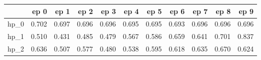 \begin{tabular}{lrrrrrrrrrr}
\toprule
{} &   ep 0 &   ep 1 &   ep 2 &   ep 3 &   ep 4 &   ep 5 &   ep 6 &   ep 7 &   ep 8 &   ep 9 \\
\midrule
hp\_0 &  0.702 &  0.697 &  0.696 &  0.696 &  0.695 &  0.695 &  0.693 &  0.696 &  0.696 &  0.696 \\
hp\_1 &  0.510 &  0.431 &  0.485 &  0.479 &  0.567 &  0.586 &  0.659 &  0.641 &  0.701 &  0.837 \\
hp\_2 &  0.636 &  0.507 &  0.577 &  0.480 &  0.538 &  0.595 &  0.618 &  0.635 &  0.670 &  0.624 \\
\bottomrule
\end{tabular}
